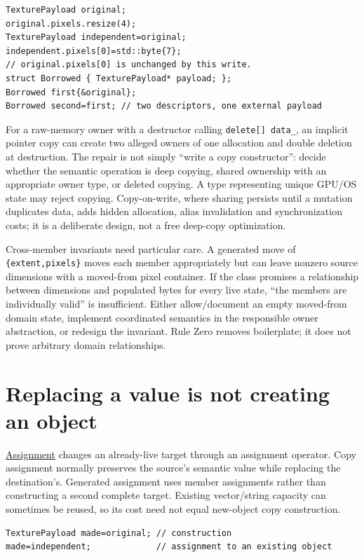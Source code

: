 \begin{verbatim}
TexturePayload original;
original.pixels.resize(4);
TexturePayload independent=original;
independent.pixels[0]=std::byte{7};
// original.pixels[0] is unchanged by this write.
struct Borrowed { TexturePayload* payload; };
Borrowed first{&original};
Borrowed second=first; // two descriptors, one external payload
\end{verbatim}

For a raw-memory owner with a destructor calling \texttt{delete{[}{]}\ data\_}, an implicit pointer copy can create two alleged owners of one allocation and double deletion at destruction. The repair is not simply ``write a copy constructor'': decide whether the semantic operation is deep copying, shared ownership with an appropriate owner type, or deleted copying. A type representing unique GPU/OS state may reject copying. Copy-on-write, where sharing persists until a mutation duplicates data, adds hidden allocation, alias invalidation and synchronization costs; it is a deliberate design, not a free deep-copy optimization.

Cross-member invariants need particular care. A generated move of \texttt{\{extent,pixels\}} moves each member appropriately but can leave nonzero source dimensions with a moved-from pixel container. If the class promises a relationship between dimensions and populated bytes for every live state, ``the members are individually valid'' is insufficient. Either allow/document an empty moved-from domain state, implement coordinated semantics in the responsible owner abstraction, or redesign the invariant. Rule Zero removes boilerplate; it does not prove arbitrary domain relationships.

\section{Replacing a value is not creating an object}\label{01-foundations-i-ch003-replacing-a-value-is-not-creating-an-object}

\hyperref[appendix-bea6beb5350f]{Assignment} changes an already-live target through an assignment operator. Copy assignment normally preserves the source's semantic value while replacing the destination's. Generated assignment uses member assignments rather than constructing a second complete target. Existing vector/string capacity can sometimes be reused, so its cost need not equal new-object copy construction.

\begin{verbatim}
TexturePayload made=original; // construction
made=independent;             // assignment to an existing object
\end{verbatim}

